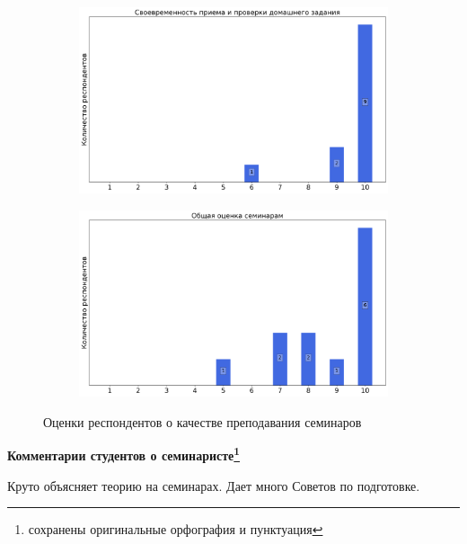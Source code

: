 \begin{figure}[H]
\begin{subfigure}[b]{0.45\textwidth}
                \includegraphics[width=\textwidth]{images/1 course/Общая физика - механика/seminarists-marks-Чивелев В.И.-2.png}
            \end{subfigure}
            \begin{subfigure}[b]{0.45\textwidth}
                \centering
                \includegraphics[width=\textwidth]{images/1 course/Общая физика - механика/seminarists-marks-Чивелев В.И.-3.png}
            \end{subfigure}	
            \caption{Оценки респондентов о качестве преподавания семинаров}
        \end{figure}

        \textbf{Комментарии студентов о семинаристе\protect\footnote{сохранены оригинальные орфография и пунктуация}}
            \begin{commentbox} 
                Круто объясняет теорию на семинарах. Дает много Советов по подготовке. 
            \end{commentbox} 
        

